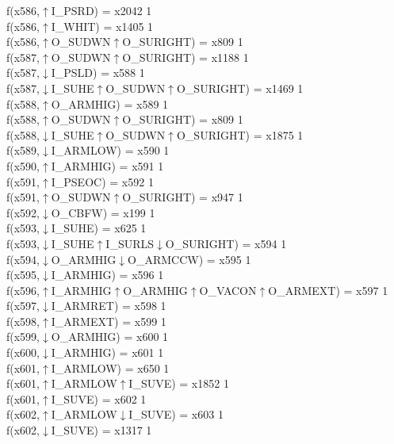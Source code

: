 f(x586,$\uparrow$I\_PSRD) = x2042 {1} \\
f(x586,$\uparrow$I\_WHIT) = x1405 {1} \\
f(x586,$\uparrow$O\_SUDWN$\uparrow$O\_SURIGHT) = x809 {1} \\
f(x587,$\uparrow$O\_SUDWN$\uparrow$O\_SURIGHT) = x1188 {1} \\
f(x587,$\downarrow$I\_PSLD) = x588 {1} \\
f(x587,$\downarrow$I\_SUHE$\uparrow$O\_SUDWN$\uparrow$O\_SURIGHT) = x1469 {1} \\
f(x588,$\uparrow$O\_ARMHIG) = x589 {1} \\
f(x588,$\uparrow$O\_SUDWN$\uparrow$O\_SURIGHT) = x809 {1} \\
f(x588,$\downarrow$I\_SUHE$\uparrow$O\_SUDWN$\uparrow$O\_SURIGHT) = x1875 {1} \\
f(x589,$\downarrow$I\_ARMLOW) = x590 {1} \\
f(x590,$\uparrow$I\_ARMHIG) = x591 {1} \\
f(x591,$\uparrow$I\_PSEOC) = x592 {1} \\
f(x591,$\uparrow$O\_SUDWN$\uparrow$O\_SURIGHT) = x947 {1} \\
f(x592,$\downarrow$O\_CBFW) = x199 {1} \\
f(x593,$\downarrow$I\_SUHE) = x625 {1} \\
f(x593,$\downarrow$I\_SUHE$\uparrow$I\_SURLS$\downarrow$O\_SURIGHT) = x594 {1} \\
f(x594,$\downarrow$O\_ARMHIG$\downarrow$O\_ARMCCW) = x595 {1} \\
f(x595,$\downarrow$I\_ARMHIG) = x596 {1} \\
f(x596,$\uparrow$I\_ARMHIG$\uparrow$O\_ARMHIG$\uparrow$O\_VACON$\uparrow$O\_ARMEXT) = x597 {1} \\
f(x597,$\downarrow$I\_ARMRET) = x598 {1} \\
f(x598,$\uparrow$I\_ARMEXT) = x599 {1} \\
f(x599,$\downarrow$O\_ARMHIG) = x600 {1} \\
f(x600,$\downarrow$I\_ARMHIG) = x601 {1} \\
f(x601,$\uparrow$I\_ARMLOW) = x650 {1} \\
f(x601,$\uparrow$I\_ARMLOW$\uparrow$I\_SUVE) = x1852 {1} \\
f(x601,$\uparrow$I\_SUVE) = x602 {1} \\
f(x602,$\uparrow$I\_ARMLOW$\downarrow$I\_SUVE) = x603 {1} \\
f(x602,$\downarrow$I\_SUVE) = x1317 {1} \\
